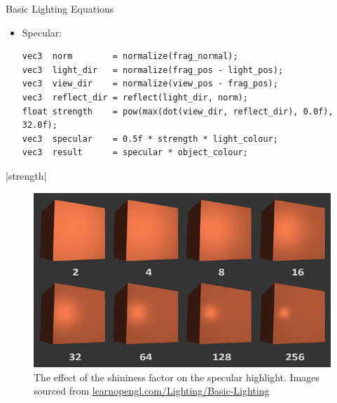 \documentclass{beamer}
\begin{document}
\begin{frame}[fragile]{Basic Lighting Equations}
    \begin{itemize}
        \item Specular:
              \footnotesize{
                  \begin{verbatim}
vec3  norm        = normalize(frag_normal);
vec3  light_dir   = normalize(frag_pos - light_pos);
vec3  view_dir    = normalize(view_pos - frag_pos);
vec3  reflect_dir = reflect(light_dir, norm);
float strength    = pow(max(dot(view_dir, reflect_dir), 0.0f), 32.0f);
vec3  specular    = 0.5f * strength * light_colour;
vec3  result      = specular * object_colour;
\end{verbatim}
              }
    \end{itemize}

    |strength|
    \begin{figure}
        \centering
        \includegraphics[height=0.30\textheight]{images/specular_shininess.png}
        \caption{The effect of the shininess factor on the specular highlight. \footnotesize{Images sourced from \url{learnopengl.com/Lighting/Basic-Lighting}}}
    \end{figure}

\end{frame}
\end{document}
